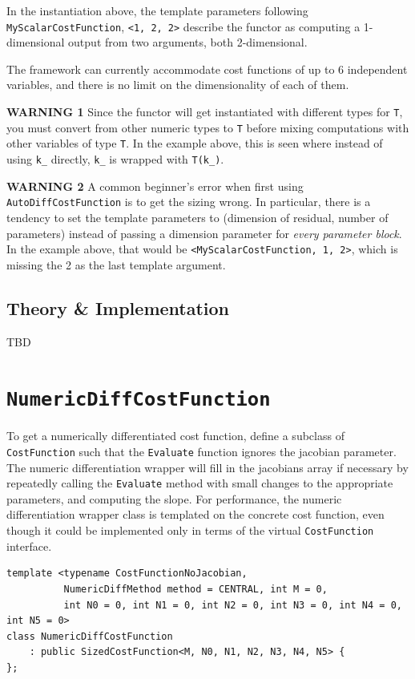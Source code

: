 In the instantiation above, the template parameters following
 \texttt{MyScalarCostFunction}, \texttt{<1, 2, 2>} describe the functor as computing a
 1-dimensional output from two arguments, both 2-dimensional.

 The framework can currently accommodate cost functions of up to 6 independent
 variables, and there is no limit on the dimensionality of each of them.

 \textbf{WARNING 1} Since the functor will get instantiated with different types for
 \texttt{T}, you must convert from other numeric types to \texttt{T} before mixing
 computations with other variables of type \texttt{T}. In the example above, this is
 seen where instead of using \texttt{k\_} directly, \texttt{k\_} is wrapped with \texttt{T(k\_)}.

 \textbf{WARNING 2} A common beginner's error when first using \texttt{AutoDiffCostFunction} is to get the sizing wrong. In particular, there is a tendency to
 set the template parameters to (dimension of residual, number of parameters)
 instead of passing a dimension parameter for {\em every parameter block}. In the
 example above, that would be \texttt{<MyScalarCostFunction, 1, 2>}, which is missing
 the 2 as the last template argument.

\subsection{Theory \& Implementation}
TBD

\section{\texttt{NumericDiffCostFunction}}
To get a numerically differentiated cost function, define a subclass of
\texttt{CostFunction} such that the \texttt{Evaluate} function ignores the jacobian
parameter. The numeric differentiation wrapper will fill in the jacobians array
 if necessary by repeatedly calling the \texttt{Evaluate} method with
small changes to the appropriate parameters, and computing the slope. For
performance, the numeric differentiation wrapper class is templated on the
concrete cost function, even though it could be implemented only in terms of
the virtual \texttt{CostFunction} interface.
\begin{verbatim}
template <typename CostFunctionNoJacobian,
          NumericDiffMethod method = CENTRAL, int M = 0,
          int N0 = 0, int N1 = 0, int N2 = 0, int N3 = 0, int N4 = 0, int N5 = 0>
class NumericDiffCostFunction
    : public SizedCostFunction<M, N0, N1, N2, N3, N4, N5> {
};
\end{verbatim}

